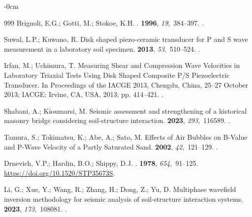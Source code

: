 \documentclass[sustainability,article,accept,pdftex,moreauthors]{Definitions/mdpi}
\begin{document}
{{\begin{adjustwidth}{-\extralength}{0cm}
\begin{thebibliography}{999}
Brignoli, E.G.; Gotti, M.; Stokoe, K.H.
.
 {\bf 1996}, {\em 19},~384--397.
.

Suwal, L.P.; Kuwano, R.
\newblock Disk shaped piezo-ceramic transducer for P and S wave measurement in
  a laboratory soil specimen.
 {\bf 2013}, {\em 53},~510--524.
.

Irfan, M.; Uchimura, T. Measuring Shear and Compression Wave Velocities in
  Laboratory Triaxial Tests Using Disk Shaped Composite P/S Piezoelectric
  Transducer.
\newblock In Proceedings of the  IACGE 2013, Chengdu, China, 25--27 October 2013;   IACGE: Irvine, CA, USA, 2013; pp. 414--421.
.

Shabani, A.; Kioumarsi, M.
\newblock Seismic assessment and strengthening of a historical masonry bridge
  considering soil-structure interaction.
 {\bf 2023}, {\em 293},~116589.
.

Tamura, S.; Tokimatsu, K.; Abe, A.; Sato, M.
\newblock Effects of Air Bubbles on B-Value and P-Wave Velocity of a Partly
  Saturated Sand.
 {\bf 2002}, {\em 42},~121--129.
.

Drnevich, V.P.; Hardin, B.O.; Shippy, D.J.
.
 {\bf 1978}, {\em
  654},~91--125. %
  {\url{https://doi.org/10.1520/STP35673S}}.

Li, G.; Xue, Y.; Wang, R.; Zhang, H.; Dong, Z.; Yu, D.
\newblock Multiphase wavefield inversion methodology for seismic analysis of
  soil-structure interaction systems.
 {\bf 2023}, {\em
  173},~108081.
.


\end{thebibliography}
\end{adjustwidth}}}
\end{document}

